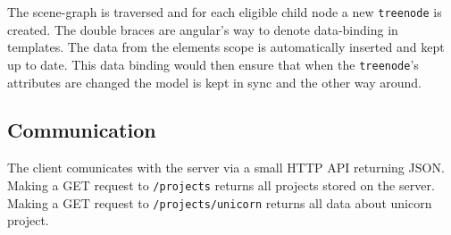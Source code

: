 The scene-graph is traversed and for each eligible child node a new
\texttt{treenode} is created. The double braces are angular's way
to denote data-binding in templates. The data from the elements scope is
automatically inserted and kept up to date. This data binding would then
ensure that when the \texttt{treenode}'s attributes are changed the model is
kept in sync and the other way around.

\subsection{Communication}
\label{interaction}

The client comunicates with the server via a small HTTP API returning \gls{JSON}.
Making a GET request to \texttt{/projects} returns all projects stored on the server.
Making a GET request to \texttt{/projects/unicorn} returns all data about unicorn project.
